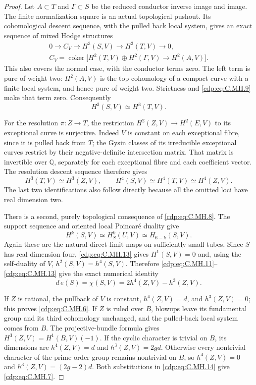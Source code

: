 \begin{proof}
Let $A\subset T$ and $\Gamma\subset S$ be the reduced
conductor inverse image and image. The finite
normalization square is an actual topological pushout.
Its cohomological descent sequence, with the pulled
back local system, gives an exact sequence of mixed
Hodge structures
\[
\begin{gathered}
0\longrightarrow C_V\longrightarrow H^3(S,V)
  \longrightarrow H^3(T,V)\longrightarrow0,\\
C_V=\operatorname{coker}\bigl[H^2(T,V)\oplus H^2(\Gamma,V)
                         \longrightarrow H^2(A,V)\bigr].
\end{gathered}
 \tag{C.MH.10}\label{cdp:eq:C.MH.10}
\]
This also covers the normal case, with the conductor
terms zero. The left term is pure of weight two:
$H^2(A,V)$ is the top cohomology of a compact curve
with a finite local system, and hence pure of weight
two. Strictness and \eqref{cdp:eq:C.MH.9} make that term zero.
Consequently
\[
                           H^3(S,V)\simeq H^3(T,V).
 \tag{C.MH.11}\label{cdp:eq:C.MH.11}
\]

For the resolution $\pi:Z\to T$, the restriction
$H^2(Z,V)\to H^2(E,V)$ to its exceptional curve is
surjective. Indeed $V$ is constant on each exceptional
fibre, since it is pulled back from $T$; the Gysin
classes of its irreducible exceptional curves restrict
by their negative-definite intersection matrix. That
matrix is invertible over $\mathbb Q$, separately
for each exceptional fibre and each coefficient
vector. The resolution descent sequence therefore
gives
\[
 H^3(T,V)\simeq H^3(Z,V),\qquad
 H^4(S,V)\simeq H^4(T,V)\simeq H^4(Z,V).
 \tag{C.MH.12}\label{cdp:eq:C.MH.12}
\]
The last two identifications also follow directly
because all the omitted loci have real dimension two.

There is a second, purely topological consequence of
\eqref{cdp:eq:C.MH.8}. The support sequence and oriented local
Poincar\'e duality give
\[
 H^k(S,V)\simeq H_S^k(U,V)
             \simeq H_{6-k}(S,V).
 \tag{C.MH.13}\label{cdp:eq:C.MH.13}
\]
Again these are the natural direct-limit maps on
sufficiently small tubes. Since $S$ has real
dimension four, \eqref{cdp:eq:C.MH.13} gives $H^1(S,V)=0$ and,
using the self-duality of $V$,
$h^2(S,V)=h^4(S,V)$. Therefore \eqref{cdp:eq:C.MH.11}--\eqref{cdp:eq:C.MH.13}
give the exact numerical identity
\[
 d\,e(S)=\chi(S,V)=2h^4(Z,V)-h^3(Z,V).
 \tag{C.MH.14}\label{cdp:eq:C.MH.14}
\]

If $Z$ is rational, the pullback of $V$ is constant,
$h^4(Z,V)=d$, and $h^3(Z,V)=0$; this proves \eqref{cdp:eq:C.MH.6}.
If $Z$ is ruled over $B$, blowups leave its fundamental
group and its third cohomology unchanged, and the
pulled-back local system comes from $B$. The
projective-bundle formula gives
$H^3(Z,V)=H^1(B,V)(-1)$. If the cyclic character is
trivial on $B$, its dimensions are
$h^4(Z,V)=d$ and $h^3(Z,V)=2gd$. Otherwise every
nontrivial character of the prime-order group remains
nontrivial on $B$, so $h^4(Z,V)=0$ and
$h^3(Z,V)=(2g-2)d$. Both substitutions in \eqref{cdp:eq:C.MH.14}
give \eqref{cdp:eq:C.MH.7}.
\end{proof}


